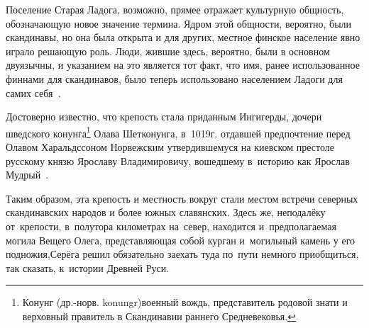 Поселение Старая Ладога, возможно, прямее отражает культурную общность, обозначающую новое значение термина. Ядром этой общности, вероятно, были скандинавы, но она была открыта и для других, местное финское население явно играло решающую роль. Люди, жившие здесь, вероятно, были в основном двуязычны, и указанием на это является тот факт, что имя, ранее использованное финнами для скандинавов, было теперь использовано населением Ладоги для самих себя~\cite{Кальмер}.

\renewcommand*{\thefootnote}{\fnsymbol{footnote}}
\setcounter{footnote}{0}

Достоверно известно, что крепость стала приданным Ингигерды, дочери шведского конунга\footnote{Конунг (др.-норв. konungr)\mdash военный вождь, представитель родовой знати и верховный правитель в Скандинавии раннего Средневековья.} Олава Шетконунга, в~1019\thinspace г. отдавшей предпочтение перед Олавом Харальдссоном Норвежским утвердившемуся на киевском престоле русскому князю Ярославу Владимировичу, вошедшему в~историю как Ярослав Мудрый~\mbox{\cite{ЛебедевЛадога}}.


Таким образом, эта крепость и местность вокруг стали местом встречи северных скандинавских народов и более южных славянских. Здесь же, неподалёку от~крепости, в~полутора километрах на~север, находится и~предполагаемая могила Вещего Олега, представляющая собой курган и~могильный камень у его подножия,\mdash Серёга решил обязательно заехать туда по~пути немного приобщиться, так сказать, к~истории Древней Руси.

\renewcommand*{\thefootnote}{\fnsymbol{footnote}}
\setcounter{footnote}{0}

